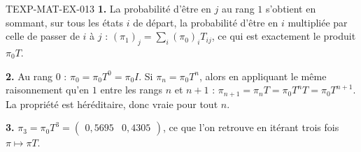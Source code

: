 \begin{corrige}{TEXP-MAT-EX-013}
\textbf{1.} La probabilité d'être en $j$ au rang $1$ s'obtient en sommant, sur
tous les états $i$ de départ, la probabilité d'être en $i$ multipliée par
celle de passer de $i$ à $j$ :
$(\pi_1)_j=\sum_i(\pi_0)_iT_{ij}$, ce qui est exactement le produit $\pi_0T$.

\textbf{2.} Au rang $0$ : $\pi_0=\pi_0T^0=\pi_0I$. Si $\pi_n=\pi_0T^n$, alors
en appliquant le même raisonnement qu'en $1$ entre les rangs $n$ et $n+1$ :
$\pi_{n+1}=\pi_nT=\pi_0T^nT=\pi_0T^{n+1}$. La propriété est héréditaire, donc
vraie pour tout $n$.

\textbf{3.} $\pi_3=\pi_0T^3=\begin{pmatrix}0{,}5695&0{,}4305\end{pmatrix}$, ce
que l'on retrouve en itérant trois fois $\pi\mapsto\pi T$.
\end{corrige}

